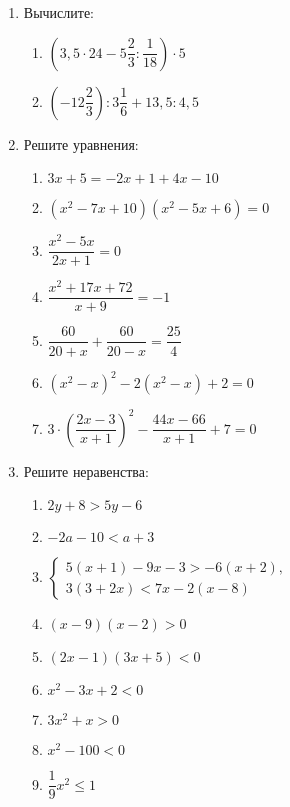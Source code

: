 \documentclass[12pt, a4paper]{article}
\begin{document}
	
	\begin{enumerate}
		\item \textit{} Вычислите:
		\begin{multicols}{2}
			\begin{enumerate}[label=\asbuk*)]
				\item $\left( 3,5 \cdot 24 - 5\dfrac{2}{3} : \dfrac{1}{18}\right) \cdot 5 $
				\item $\left( -12\dfrac{2}{3}\right):3\dfrac{1}{6} +13,5:4,5$
			\end{enumerate}
		\end{multicols}
		\item \textit{} Решите уравнения:
		\begin{multicols}{2}
			\begin{enumerate}[label=\asbuk*)]
				\item $3x+5=-2x+1+4x-10$
				\item $(x^2-7x+10)(x^2-5x+6)=0$
				\item $\dfrac{x^2-5x}{2x+1}=0$
				\item $\dfrac{x^2+17x+72}{x+9}=-1$
				\item $\dfrac{60}{20+x}+\dfrac{60}{20-x}=\dfrac{25}{4}$
				\item $(x^2-x)^2-2(x^2-x)+2=0$
				\item $3\cdot\left(\dfrac{2x-3}{x+1}\right)^2-\dfrac{44x-66}{x+1}+7=0$
			\end{enumerate}
		\end{multicols}
		\item \textit{} Решите неравенства:
		\begin{multicols}{2}
			\begin{enumerate}[label=\asbuk*)]
				\item $2y+8>5y-6$
				\item $-2a-10<a+3$
				\item $
				\left\{
				\begin{aligned}
					5(x+1)-9x-3>-6(x+2),\\
					3(3+2x)<7x-2(x-8)
				\end{aligned}
				\right.
				$
				\item $(x-9)(x-2)>0$
				\item $(2x-1)(3x+5)<0$
				\item $x^2-3x+2<0$
				\item $3x^2+x>0$
				\item $x^2-100<0$
				\item $\dfrac{1}{9}x^2\leqslant 1$

\end{enumerate}
\end{multicols}
\end{enumerate}
\end{document}
